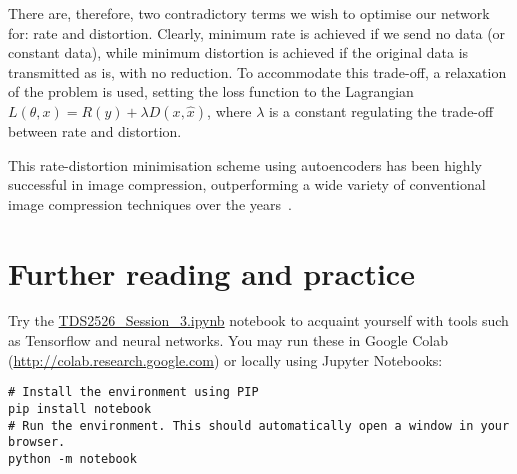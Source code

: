 There are, therefore, two contradictory terms we wish to optimise our network for: rate and distortion. Clearly, minimum rate is achieved if we send no data (or constant data), while minimum distortion is achieved if the original data is transmitted as is, with no reduction. To accommodate this trade-off, a relaxation of the problem is used, setting the loss function to the Lagrangian $L(\theta, x) = R(y) + \lambda D(x, \hat{x})$, where $\lambda$ is a constant regulating the trade-off between rate and distortion.

This rate-distortion minimisation scheme using autoencoders has been highly successful in image compression, outperforming a wide variety of conventional image compression techniques over the years~\cite{BalleLaparra2017factorised, balle2018hyperprior, minnen2018hierarchical, choi2019conditional, cheng2019residual, yang2020modulated, cheng2020gmm_attention, yang2021slimmable,  He2022ELIC, fu2024checkerboardresidual}.


\section*{Further reading and practice}
\vspace{0.25cm}

\begin{exercise}
Try the \url{TDS2526_Session_3.ipynb} notebook to acquaint yourself with tools such as Tensorflow and neural networks. You may run these in Google Colab (\url{http://colab.research.google.com}) or locally using Jupyter Notebooks:

\begin{verbatim}
# Install the environment using PIP
pip install notebook
# Run the environment. This should automatically open a window in your browser.
python -m notebook
\end{verbatim}
\end{exercise}
